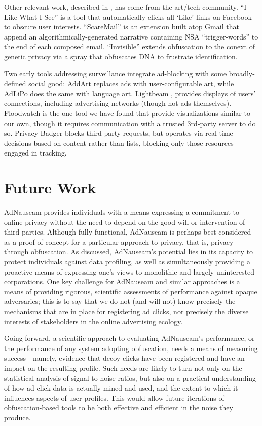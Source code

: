 \documentclass[conference]{IEEEtran}
\begin{document}
Other relevant work, described in \cite{Howe-3}, has come from the art/tech community. “I Like What I See” is a tool  that automatically clicks all ‘Like’ links on Facebook to obscure user interests. “ScareMail” \cite{Grosser} is an extension built atop Gmail that append an algorithmically-generated narrative containing NSA “trigger-words” to the end of each composed email. “Invisible”\cite{Hagborg} extends obfuscation to the conext of genetic privacy via a spray that obfuscates DNA to frustrate identification.

Two early tools addressing surveillance integrate ad-blocking with some broadly-defined social good: AddArt \cite{AddArt} replaces ads with user-configurable art, while AdLiPo \cite{Howe-0} does the same with language art. Lightbeam \cite{Mozilla}, provides displays of users' connections, including advertising networks (though not ads themselves). Floodwatch \cite{Floodwatch} is the one tool we have found that provide visualizations similar to our own, though it requires communication with a trusted 3rd-party server to do so. Privacy Badger \cite{EFF-0} blocks third-party requests, but operates via real-time decisions based on content rather than lists, blocking only those resources engaged in tracking.

\section{Future Work}

AdNauseam provides individuals with a means expressing a commitment to online privacy without the need to depend on the good will or intervention of third-parties. Although fully functional, AdNauseam is perhaps best considered as a proof of concept for a particular approach to privacy, that is, privacy through obfuscation. As discussed, AdNauseam's potential lies in its capacity to protect individuals against data profiling, as well as simultaneously providing a proactive means of expressing one's views to monolithic and largely uninterested corporations. One key challenge for AdNauseam and similar approaches is a means of providing rigorous, scientific assessments of performance against opaque adversaries; this is to say that we do not (and will not) know precisely the mechanisms that are in place for registering ad clicks, nor precisely the diverse interests of stakeholders in the online advertising ecology.

Going forward, a scientific approach to evaluating AdNauseam's performance, or the performance of any system adopting obfuscation, needs a means of measuring success---namely, evidence that decoy clicks have been registered and have an impact on the resulting profile. Such needs are likely to turn not only on the statistical analysis of signal-to-noise ratios, but also on a practical understanding of how ad-click data is actually mined and used, and the extent to which it influences aspects of user profiles. This would allow future iterations of obfuscation-based tools to be both effective and efficient in the noise they produce.
\end{document}

